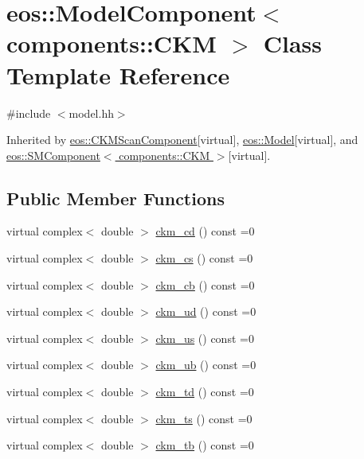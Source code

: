 \hypertarget{classeos_1_1ModelComponent_3_01components_1_1CKM_01_4}{
\section{eos::ModelComponent$<$ components::CKM $>$ Class Template Reference}
\label{classeos_1_1ModelComponent_3_01components_1_1CKM_01_4}
}


{\ttfamily \#include $<$model.hh$>$}

Inherited by \hyperlink{classeos_1_1CKMScanComponent}{eos::CKMScanComponent}{\ttfamily  \mbox{[}virtual\mbox{]}}, \hyperlink{classeos_1_1Model}{eos::Model}{\ttfamily  \mbox{[}virtual\mbox{]}}, and \hyperlink{classeos_1_1SMComponent_3_01components_1_1CKM_01_4}{eos::SMComponent$<$ components::CKM $>$}{\ttfamily  \mbox{[}virtual\mbox{]}}.\subsection*{Public Member Functions}
\begin{DoxyCompactItemize}
\item 
virtual complex$<$ double $>$ \hyperlink{classeos_1_1ModelComponent_3_01components_1_1CKM_01_4_a91f57e4ea6a4072d25e533a424cb0373}{ckm\_\-cd} () const =0
\item 
virtual complex$<$ double $>$ \hyperlink{classeos_1_1ModelComponent_3_01components_1_1CKM_01_4_a9d537c64b4c3379d4a7ebd8ccc815a7e}{ckm\_\-cs} () const =0
\item 
virtual complex$<$ double $>$ \hyperlink{classeos_1_1ModelComponent_3_01components_1_1CKM_01_4_aacb78ba3cf4df16bff0c6b6289b1a955}{ckm\_\-cb} () const =0
\item 
virtual complex$<$ double $>$ \hyperlink{classeos_1_1ModelComponent_3_01components_1_1CKM_01_4_a56044f519ef2befa09d4912cb8f9188a}{ckm\_\-ud} () const =0
\item 
virtual complex$<$ double $>$ \hyperlink{classeos_1_1ModelComponent_3_01components_1_1CKM_01_4_ac3363cbfe22a4354e833a67fdc5ed1fa}{ckm\_\-us} () const =0
\item 
virtual complex$<$ double $>$ \hyperlink{classeos_1_1ModelComponent_3_01components_1_1CKM_01_4_a71547bad7b092be1631067f270056acd}{ckm\_\-ub} () const =0
\item 
virtual complex$<$ double $>$ \hyperlink{classeos_1_1ModelComponent_3_01components_1_1CKM_01_4_a4bcd2be1cd84c0b6ea86ded723477094}{ckm\_\-td} () const =0
\item 
virtual complex$<$ double $>$ \hyperlink{classeos_1_1ModelComponent_3_01components_1_1CKM_01_4_a94edc4a96770b9a16e078c483670ecc3}{ckm\_\-ts} () const =0
\item 
virtual complex$<$ double $>$ \hyperlink{classeos_1_1ModelComponent_3_01components_1_1CKM_01_4_a047bf55d51bf31e6b3a00777e7986613}{ckm\_\-tb} () const =0
\end{DoxyCompactItemize}



